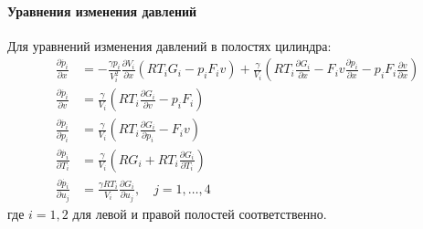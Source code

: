 \paragraph{Уравнения изменения давлений}
Для уравнений изменения давлений в полостях цилиндра:
\begin{equation}\label{eq:ch2/jacobian_pressure}
    \begin{aligned}
        \frac{\partial \dot{p_i}}{\partial x}   & = -\frac{\gamma p_i}{V_i^2}\frac{\partial V_i}{\partial x}(RT_iG_i - p_iF_iv) + \frac{\gamma}{V_i}\left(RT_i\frac{\partial G_i}{\partial x} - F_iv\frac{\partial p_i}{\partial x} - p_iF_i\frac{\partial v}{\partial x}\right) \\
        \frac{\partial \dot{p_i}}{\partial v}   & = \frac{\gamma}{V_i}\left(RT_i\frac{\partial G_i}{\partial v} - p_iF_i\right)                                                                                                                                                  \\
        \frac{\partial \dot{p_i}}{\partial p_i} & = \frac{\gamma}{V_i}\left(RT_i\frac{\partial G_i}{\partial p_i} - F_iv\right)                                                                                                                                                  \\
        \frac{\partial \dot{p_i}}{\partial T_i} & = \frac{\gamma}{V_i}\left(RG_i + RT_i\frac{\partial G_i}{\partial T_i}\right)                                                                                                                                                  \\
        \frac{\partial \dot{p_i}}{\partial u_j} & = \frac{\gamma RT_i}{V_i}\frac{\partial G_i}{\partial u_j}, \quad j = 1, \ldots, 4
    \end{aligned}
\end{equation}
где $i = 1, 2$ для левой и правой полостей соответственно.

